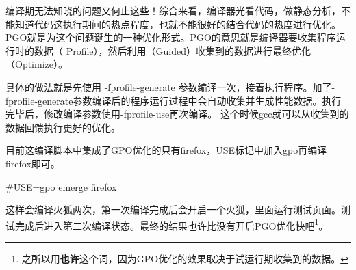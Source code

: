 编译期无法知晓的问题又何止这些！综合来看，编译器光看代码，做静态分析，不能知道代码这执行期间的热点程度，也就不能很好的结合代码的热度进行优化。
PGO就是为这个问题诞生的一种优化形式。PGO的意思就是编译器要收集程序运行时的数据（ Profile），然后利用（Guided）收集到的数据进行最终优化（Optimize）。

具体的做法就是先使用 -fprofile-generate 参数编译一次，接着执行程序。加了-fprofile-generate参数编译后的程序运行过程中会自动收集并生成性能数据。执行完毕后，修改编译参数使用-fprofile-use再次编译。
这个时候gcc就可以从收集到的数据回馈执行更好的优化。

目前这编译脚本中集成了GPO优化的只有firefox，USE标记中加入gpo再编译firefox即可。

\begin{code}
\#USE=gpo emerge firefox
\end{code}

这样会编译火狐两次，第一次编译完成后会开启一个火狐，里面运行测试页面。测试完成后进入第二次编译状态。最终的结果也许比没有开启PGO优化快吧\footnote{之所以用\textbf{也许}这个词，因为GPO优化的效果取决于试运行期收集到的数据。}。


